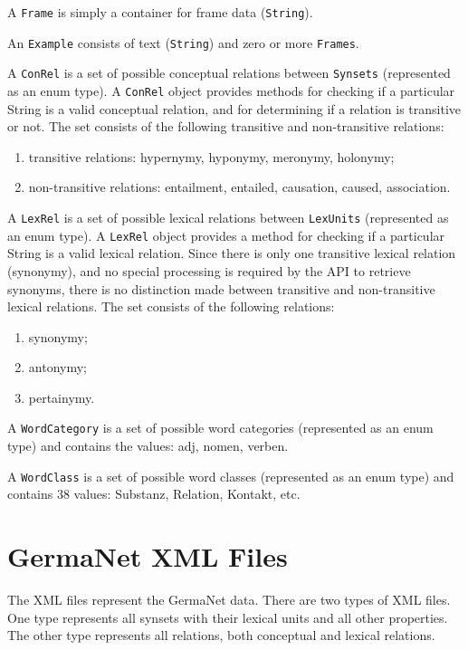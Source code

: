 \documentclass[12pt,a4paper,english,utf8]{report}
\begin{document}
A \texttt{Frame} is simply a container for frame data (\texttt{String}).

An \texttt{Example} consists of text (\texttt{String}) and zero or more \texttt{Frames}.

A \texttt{ConRel} is a set of possible conceptual relations between \texttt{Synsets} (represented as an enum type). A \texttt{ConRel} object provides methods for checking if a particular String is a valid conceptual relation, and for determining if a relation is transitive or not.  The set consists of the following transitive and non-transitive relations:

\renewcommand{\labelenumi}{•}
\begin{enumerate}
	\item transitive relations: hypernymy, hyponymy, meronymy, holonymy;
	\item non-transitive relations:	entailment, entailed, causation, caused, association.
\end{enumerate}

A \texttt{LexRel} is a set of possible lexical relations between \texttt{LexUnits} (represented as an enum type). A \texttt{LexRel} object provides a method for checking if a particular String is a valid lexical relation. Since there is only one transitive lexical relation (synonymy), and no special processing is required by the API to retrieve synonyms, there is no distinction made between transitive and non-transitive lexical relations. The set consists of the following relations:

\begin{enumerate}
	\item synonymy;
	\item antonymy;
	\item pertainymy.
\end{enumerate}

A \texttt{WordCategory} is a set of possible word categories (represented as an enum type) and contains the values: adj, nomen, verben.

A \texttt{WordClass} is a set of possible word classes (represented as an enum type) and contains 38 values: Substanz, Relation, Kontakt, etc.



\section{GermaNet XML Files}
The XML files represent the GermaNet data. There are two types of XML files. One type represents all synsets with their lexical units and all other properties. The other type represents all relations, both conceptual and lexical relations.
\end{document}
